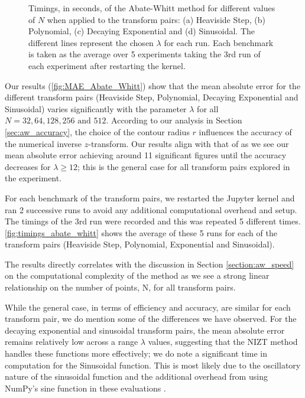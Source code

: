 \documentclass[a4paper]{report}
\begin{document}
\begin{figure}[H]
    \caption{Timings, in seconds, of the Abate-Whitt method for different values of $N$ when applied to the transform pairs: (a) Heaviside Step, (b) Polynomial, (c) Decaying Exponential and (d) Sinusoidal. The different lines represent the chosen $\lambda$ for each run. Each benchmark is taken as the average over 5 experiments taking the 3rd run of each experiment after restarting the kernel.}
    \label{fig:timings_abate_whitt}
\end{figure}

Our results (\autoref{fig:MAE_Abate_Whitt}) show that the mean absolute error for the different transform pairs (Heaviside Step, Polynomial, Decaying Exponential and Sinusoidal) varies significantly with the parameter $\lambda$ for all $N = 32, 64, 128, 256 \text{ and } 512$. According to our analysis in Section \ref{sec:aw_accuracy}, the choice of the contour radius $r$ influences the accuracy of the numerical inverse $z$-transform. Our results align with that of \citet{loveless2021guido} as we see our mean absolute error achieving around 11 significant figures until the accuracy decreases for $\lambda \geq 12$; this is the general case for all transform pairs explored in the experiment.

For each benchmark of the transform pairs, we restarted the Jupyter kernel and ran 2 successive runs to avoid any additional computational overhead and setup. The timings of the 3rd run were recorded and this was repeated 5 different times. \autoref{fig:timings_abate_whitt} shows the average of these 5 runs for each of the transform pairs (Heaviside Step, Polynomial, Exponential and Sinusoidal).

The results directly correlates with the discussion in Section \ref{section:aw_speed} on the computational complexity of the method as we see a strong linear relationship on the number of points, N, for all transform pairs.

While the general case, in terms of efficiency and accuracy, are similar for each transform pair, we do mention some of the differences we have observed. For the decaying exponential and sinusoidal transform pairs, the mean absolute error remains relatively low across a range $\lambda$ values, suggesting that the NIZT method handles these functions more effectively; we do note a significant time in computation for the Sinusoidal function. This is most likely due to the oscillatory nature of the sinusoidal function and the additional overhead from using NumPy's sine function in these evaluations \citep{harris2020array}.
\end{document}
